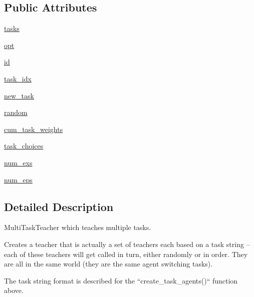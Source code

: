 \subsection*{Public Attributes}
\begin{DoxyCompactItemize}
\item 
\hyperlink{classparlai_1_1core_1_1agents_1_1MultiTaskTeacher_a5d284137aebeea42719984d60d3d72f6}{tasks}
\item 
\hyperlink{classparlai_1_1core_1_1agents_1_1MultiTaskTeacher_a116b724be9c512d36f1d43cb9be86b78}{opt}
\item 
\hyperlink{classparlai_1_1core_1_1agents_1_1MultiTaskTeacher_a875d7474eb3fcb0ff1b302db284ebf7b}{id}
\item 
\hyperlink{classparlai_1_1core_1_1agents_1_1MultiTaskTeacher_aff3455bc2af79f632214a4de2bad3d11}{task\+\_\+idx}
\item 
\hyperlink{classparlai_1_1core_1_1agents_1_1MultiTaskTeacher_a3a4f918f0ae0014eaae5cd2c6b14bc2e}{new\+\_\+task}
\item 
\hyperlink{classparlai_1_1core_1_1agents_1_1MultiTaskTeacher_a4bf83cc6d6e942b257ac249745bae007}{random}
\item 
\hyperlink{classparlai_1_1core_1_1agents_1_1MultiTaskTeacher_a1060c15dbbbe7fedfb89ba94969c5b99}{cum\+\_\+task\+\_\+weights}
\item 
\hyperlink{classparlai_1_1core_1_1agents_1_1MultiTaskTeacher_ae142e91e45c96fabf73d73639db3ab18}{task\+\_\+choices}
\item 
\hyperlink{classparlai_1_1core_1_1agents_1_1MultiTaskTeacher_ac4287538dada130117c19347765ac654}{num\+\_\+exs}
\item 
\hyperlink{classparlai_1_1core_1_1agents_1_1MultiTaskTeacher_ad3cdb9945ee238eff22fcbf5be5dfb16}{num\+\_\+eps}
\end{DoxyCompactItemize}


\subsection{Detailed Description}
\begin{DoxyVerb}MultiTaskTeacher which teaches multiple tasks.

Creates a teacher that is actually a set of teachers each based on a task
string -- each of these teachers will get called in turn,
either randomly or in order.  They are all in the same world (they are the
same agent switching tasks).

The task string format is described for the ``create_task_agents()``
function above.
\end{DoxyVerb}
 

